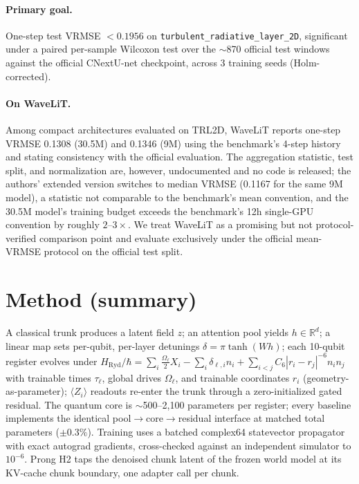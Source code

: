 \documentclass{article}
\begin{document}
\paragraph{Primary goal.} One-step test VRMSE $< 0.1956$ on
\texttt{turbulent\_radiative\_layer\_2D}, significant under a paired
per-sample Wilcoxon test over the $\sim$870 official test windows against the
official CNextU-net checkpoint, across 3 training seeds (Holm-corrected).

\paragraph{On WaveLiT.} Among compact architectures evaluated on TRL2D,
WaveLiT \citep{sankaran2026wavelit} reports one-step VRMSE 0.1308 (30.5M) and
0.1346 (9M) using the benchmark's 4-step history and stating consistency with
the official evaluation. The aggregation statistic, test split, and
normalization are, however, undocumented and no code is released; the authors'
extended version switches to median VRMSE (0.1167 for the same 9M model), a
statistic not comparable to the benchmark's mean convention, and the 30.5M
model's training budget exceeds the benchmark's 12h single-GPU convention by
roughly $2$--$3\times$. We treat WaveLiT as a promising but not
protocol-verified comparison point and evaluate exclusively under the official
mean-VRMSE protocol on the official test split.

\section{Method (summary)}
\label{sec:method}

A classical trunk produces a latent field $z$; an attention pool yields
$h \in \mathbb{R}^d$; a linear map sets per-qubit, per-layer detunings
$\delta = \pi \tanh(W h)$; each 10-qubit register evolves under
$H_{\mathrm{Ryd}}/\hbar = \sum_i \tfrac{\Omega_\ell}{2} X_i - \sum_i
\delta_{\ell,i} n_i + \sum_{i<j} C_6 |r_i - r_j|^{-6} n_i n_j$
with trainable times $\tau_\ell$, global drives $\Omega_\ell$, and trainable
coordinates $r_i$ (geometry-as-parameter); $\langle Z_i \rangle$ readouts
re-enter the trunk through a zero-initialized gated residual. The quantum
core is $\sim$500--2{,}100 parameters per register; every baseline implements
the identical pool$\to$core$\to$residual interface at matched total parameters
($\pm 0.3\%$). Training uses a batched complex64 statevector propagator with
exact autograd gradients, cross-checked against an independent simulator to
$10^{-6}$. Prong H2 taps the denoised chunk latent of the frozen world model
at its KV-cache chunk boundary, one adapter call per chunk.
\end{document}
